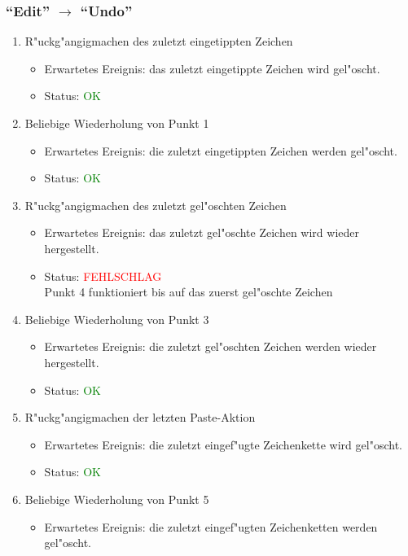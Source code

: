 \subsubsection{"`Edit"' $\rightarrow$ "`Undo"'}
\begin{enumerate}
\item R"uckg"angigmachen des zuletzt eingetippten Zeichen
\begin{itemize}
\item Erwartetes Ereignis: das zuletzt eingetippte Zeichen wird gel"oscht. 
\item Status: \textcolor{green}{OK}
\end{itemize}
\item Beliebige Wiederholung von Punkt 1
\begin{itemize}
\item Erwartetes Ereignis: die zuletzt eingetippten Zeichen werden gel"oscht. 
\item Status: \textcolor{green}{OK}
\end{itemize}
\item R"uckg"angigmachen des zuletzt gel"oschten Zeichen
\begin{itemize}
\item Erwartetes Ereignis: das zuletzt gel"oschte Zeichen wird wieder hergestellt. 
\item Status: \textcolor{red}{FEHLSCHLAG} \\
Punkt 4 funktioniert bis auf das zuerst gel"oschte Zeichen
\end{itemize}
\item Beliebige Wiederholung von Punkt 3
\begin{itemize}
\item Erwartetes Ereignis: die zuletzt gel"oschten Zeichen werden wieder hergestellt. 
\item Status: \textcolor{green}{OK}
\end{itemize}
\item R"uckg"angigmachen der letzten Paste-Aktion
\begin{itemize}
\item Erwartetes Ereignis: die zuletzt eingef"ugte Zeichenkette wird gel"oscht. 
\item Status: \textcolor{green}{OK}
\end{itemize}
\item Beliebige Wiederholung von Punkt 5
\begin{itemize}
\item Erwartetes Ereignis: die zuletzt eingef"ugten Zeichenketten werden gel"oscht. 

\end{itemize}
\end{enumerate}
